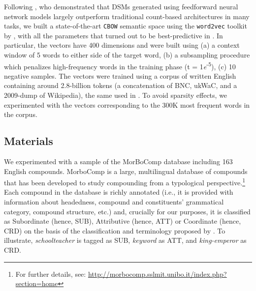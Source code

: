 \documentclass[output=paper]{langsci/langscibook}
\begin{document}
Following \cite{baronipredict}, who demonstrated that DSMs generated using feedforward neural network models largely outperform traditional count-based architectures in many tasks, we built a state-of-the-art \texttt{CBOW} semantic space using the \texttt{word2vec} toolkit by \cite{mikolov2013}, with all the parameters that turned out to be best-predictive in \cite{baronipredict}. In particular, the vectors have 400 dimensions and were built using (a) a context window of 5 words to either side of the target word, (b) a subsampling procedure which penalizes high-frequency words in the training phase (t = 1\emph{e}\textsuperscript{-5}), (c) 10 negative samples. The vectors were trained using a corpus of written English containing around 2.8-billion tokens (a concatenation of BNC, ukWaC, and a 2009-dump of Wikipedia), the same used in \cite{baronipredict}. To avoid sparsity effects, we experimented with the vectors corresponding to the 300K most frequent words in the corpus.


\subsection{Materials}

We experimented with a sample of the MorBoComp database including 163 English compounds. MorboComp is a large, multilingual database of compounds that has been developed to study compounding from a typological perspective.\footnote{For further details, see: \url{http://morbocomp.sslmit.unibo.it/index.php?section=home}} Each compound in the database is richly annotated (i.e., it is provided with information about headedness, compound and constituents' grammatical category, compound structure, etc.) and, crucially for our purposes, it is classified as Subordinate (hence, SUB), Attributive (hence, ATT) or Coordinate (hence, CRD) on the basis of the classification and terminology proposed by \cite{SB2005}. To illustrate, \emph{schoolteacher} is tagged as SUB, \emph{keyword} as ATT, and \emph{king-emperor} as CRD.
\end{document}

